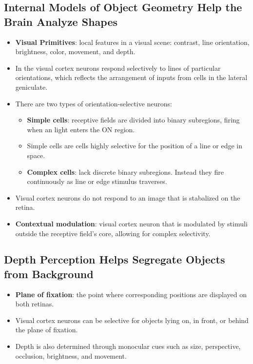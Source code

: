 \documentclass[12pt,a4paper]{article}
\begin{document}
\subsection{Internal Models of Object Geometry Help the Brain Analyze Shapes}
\begin{itemize}
    \item \textbf{Visual Primitives}: local features in a visual scene: contrast, line orientation, brightness, color, movement, and depth.
    \item In the visual cortex neurons respond selectively to lines of particular orientations, which reflects the arrangement of inputs from cells in the lateral geniculate.
    \item There are two types of orientation-selective neurons:
        \begin{itemize}
            \item \textbf{Simple cells}: receptive fields are divided into binary subregions, firing when an light enters the ON region.
            \item Simple cells are cells highly selective for the position of a line or edge in space.
            \item \textbf{Complex cells}: lack discrete binary subregions. Instead they fire continuously as line or edge stimulus traverses.
        \end{itemize}
    \item Visual cortex neurons do not respond to an image that is stabalized on the retina.
    \item \textbf{Contextual modulation}: visual cortex neuron that is modulated by stimuli outside the receptive field's core, allowing for complex selectivity.
\end{itemize}

\subsection{Depth Perception Helps Segregate Objects from Background}
\begin{itemize}
    \item \textbf{Plane of fixation}: the point where corresponding positions are displayed on both retinas.
    \item Visual cortex neurons can be selective for objects lying on, in front, or behind the plane of fixation.
    \item Depth is also determined through monocular cues such as size, perspective, occlusion, brightness, and movement. 
\end{itemize}
\end{document}
